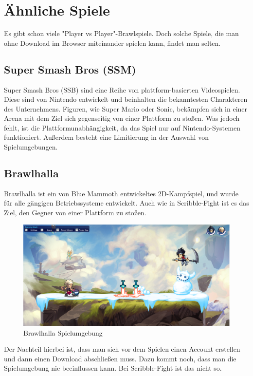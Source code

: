 \section{Ähnliche Spiele}
Es gibt schon viele "Player vs Player"-Brawlspiele. Doch solche Spiele, die man ohne Download im Browser
miteinander spielen kann, findet man selten. 

\subsection{Super Smash Bros (SSM)}
Super Smash Bros (SSB) sind eine Reihe von plattform-basierten Videospielen.
Diese sind von Nintendo entwickelt und beinhalten die bekanntesten Charakteren des Unternehmens.
Figuren, wie Super Mario oder Sonic, bekämpfen sich in einer Arena mit dem Ziel sich gegenseitig 
von einer Plattform zu stoßen.
Was jedoch fehlt, ist die Plattformunabhängigkeit, da das Spiel nur auf Nintendo-Systemen funktioniert.
Außerdem besteht eine Limitierung in der Auswahl von Spielumgebungen.

\subsection{Brawlhalla}
Brawlhalla ist ein von Blue Mammoth entwickeltes 2D-Kampfspiel, und wurde für alle gängigen Betriebssysteme entwickelt. 
Auch wie in Scribble-Fight ist es das Ziel, den Gegner von einer Plattform zu stoßen.

\begin{figure}
    \centering
    \includegraphics[scale=0.3]{pics/brawlhalla.PNG}
    \caption{Brawlhalla Spielumgebung}
    \label{fig:impl:knuth}
\end{figure}

Der Nachteil hierbei ist, dass man sich vor dem Spielen einen Account erstellen
und dann einen Download abschließen muss. Dazu kommt noch, dass man die Spielumgebung nie beeinflussen kann.
Bei Scribble-Fight ist das nicht so. 

